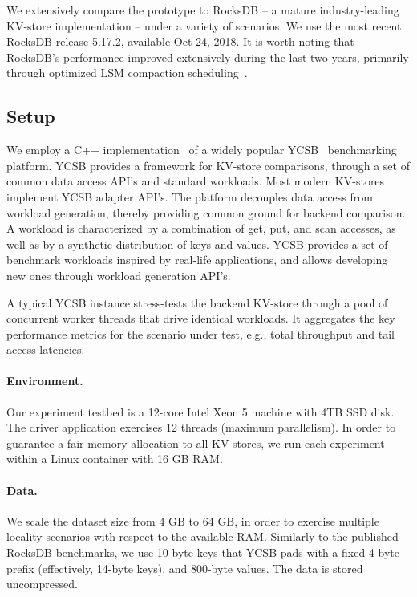 We extensively compare the \sys\/ prototype to RocksDB -- a mature industry-leading KV-store implementation  -- under a variety of scenarios.  We use the most recent RocksDB release 5.17.2, available Oct 24, 2018.  
It is worth noting that RocksDB's performance improved extensively during the last two years, primarily through 
optimized LSM compaction scheduling~\cite{RocksDBProgress}.   

\subsection{Setup}
We employ a C++ implementation~\cite{Cpp-YCSB} of a widely popular YCSB~\cite{YCSB} benchmarking platform. 
YCSB provides a framework for KV-store comparisons, through a set of common data access API's and standard workloads. 
Most modern KV-stores implement  YCSB adapter API's. The platform decouples data access from workload generation, 
thereby providing common ground for backend comparison. A workload is characterized by a combination of get, put, 
and scan accesses, as well as by a synthetic distribution of keys and values. YCSB provides a set of benchmark workloads
inspired by real-life applications, and allows developing new ones through workload generation API's. 

A typical YCSB instance stress-tests the backend KV-store through a pool of concurrent worker threads that drive identical
workloads. It aggregates the key performance metrics for the scenario under test, e.g., total throughput and tail access latencies. 

\paragraph{Environment.}
Our experiment testbed is a 12-core Intel Xeon 5 machine with 4TB SSD disk. The driver application exercises 12 threads (maximum parallelism). In order to guarantee a fair memory allocation to all KV-stores, we run each experiment 
within a Linux container with 16 GB RAM. 

\paragraph{Data.} We scale the dataset size from 4 GB to 64 GB, in order to exercise multiple locality 
scenarios with respect to the available RAM. Similarly to the published RocksDB benchmarks, we use 
10-byte keys that YCSB pads with a fixed 4-byte prefix (effectively, 14-byte keys), and 800-byte values. 
The data is stored uncompressed. 

